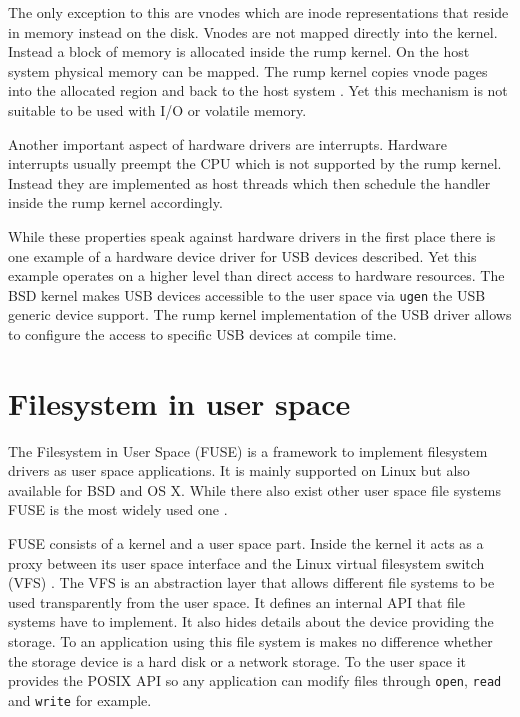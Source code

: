 \documentclass[
a4paper,
12pt,
notitlepage,
parskip=half,
DIV=11,
]{scrbook}
\begin{document}
		The only exception to this are vnodes which are inode representations that reside in memory instead on the disk.
		Vnodes are not mapped directly into the kernel.
		Instead a block of memory is allocated inside the rump kernel.
		On the host system physical memory can be mapped.
		The rump kernel copies vnode pages into the allocated region and back to the host system \citep{kantee}.
		Yet this mechanism is not suitable to be used with I/O or volatile memory.
		
		Another important aspect of hardware drivers are interrupts.
		Hardware interrupts usually preempt the CPU which is not supported by the rump kernel.
		Instead they are implemented as host threads which then schedule the handler inside the rump kernel accordingly. \citep{kantee}
		
		While these properties speak against hardware drivers in the first place there is one example of a hardware device driver for USB devices described.
		Yet this example operates on a higher level than direct access to hardware resources.
		The BSD kernel makes USB devices accessible to the user space via \texttt{ugen} the USB generic device support.
		The rump kernel implementation of the USB driver allows to configure the access to specific USB devices at compile time. \citep{kantee} \citep{ugen}
		
		\section{Filesystem in user space}
		
		The Filesystem in User Space (FUSE) \citep{fuse} is a framework to implement filesystem drivers as user space applications.
		It is mainly supported on Linux but also available for BSD and OS X.
		While there also exist other user space file systems FUSE is the most widely used one \citep{202324}.
	
		FUSE consists of a kernel and a user space part.
		Inside the kernel it acts as a proxy between its user space interface and the Linux virtual filesystem switch (VFS) \citep{202324}.
		The VFS is an abstraction layer that allows different file systems to be used transparently from the user space.
		It defines an internal API that file systems have to implement.
		It also hides details about the device providing the storage.
		To an application using this file system is makes no difference whether the storage device is a hard disk or a network storage.
		To the user space it provides the POSIX API so any application can modify files through \texttt{open}, \texttt{read} and \texttt{write} for example. \citep{ibmvfs}
		
\end{document}
